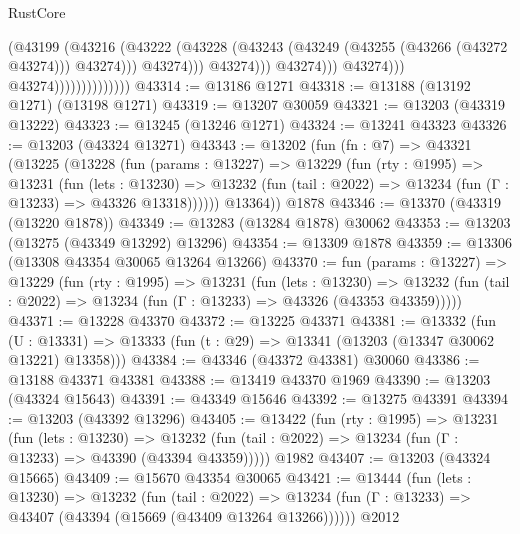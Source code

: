 \begin{lexlean}{RustCore}
\begin{coremodule}
                                                  (@43199
                                                    (@43216
                                                      (@43222
                                                        (@43228
                                                          (@43243
                                                            (@43249
                                                              (@43255 (@43266 (@43272 @43274)))
                                                              @43274)))
                                                        @43274)))
                                                  @43274)))
                                            @43274)))
                                      @43274)))
                                @43274))))))))))))))
@43314 := @13186 @1271
@43318 := @13188 (@13192 @1271) (@13198 @1271)
@43319 := @13207 @30059
@43321 := @13203 (@43319 @13222)
@43323 := @13245 (@13246 @1271)
@43324 := @13241 @43323
@43326 := @13203 (@43324 @13271)
@43343 := @13202
    (fun (fn : @7) =>
    @43321
      (@13225
        (@13228
          (fun (params : @13227) =>
          @13229
            (fun (rty : @1995) =>
            @13231
              (fun (lets : @13230) =>
              @13232 (fun (tail : @2022) => @13234 (fun (Γ : @13233) => @43326 @13318))))))
        @13364))
    @1878
@43346 := @13370 (@43319 (@13220 @1878))
@43349 := @13283 (@13284 @1878) @30062
@43353 := @13203 (@13275 (@43349 @13292) @13296)
@43354 := @13309 @1878
@43359 := @13306 (@13308 @43354 @30065 @13264 @13266)
@43370 := fun (params : @13227) =>
  @13229
    (fun (rty : @1995) =>
    @13231
      (fun (lets : @13230) =>
      @13232 (fun (tail : @2022) => @13234 (fun (Γ : @13233) => @43326 (@43353 @43359)))))
@43371 := @13228 @43370
@43372 := @13225 @43371
@43381 := @13332
    (fun (U : @13331) => @13333 (fun (t : @29) => @13341 (@13203 (@13347 @30062 @13221) @13358)))
@43384 := @43346 (@43372 @43381) @30060
@43386 := @13188 @43371 @43381
@43388 := @13419 @43370 @1969
@43390 := @13203 (@43324 @15643)
@43391 := @43349 @15646
@43392 := @13275 @43391
@43394 := @13203 (@43392 @13296)
@43405 := @13422
    (fun (rty : @1995) =>
    @13231
      (fun (lets : @13230) =>
      @13232 (fun (tail : @2022) => @13234 (fun (Γ : @13233) => @43390 (@43394 @43359)))))
    @1982
@43407 := @13203 (@43324 @15665)
@43409 := @15670 @43354 @30065
@43421 := @13444
    (fun (lets : @13230) =>
    @13232
      (fun (tail : @2022) =>
      @13234 (fun (Γ : @13233) => @43407 (@43394 (@15669 (@43409 @13264 @13266))))))
    @2012

\end{coremodule}
\end{lexlean}
